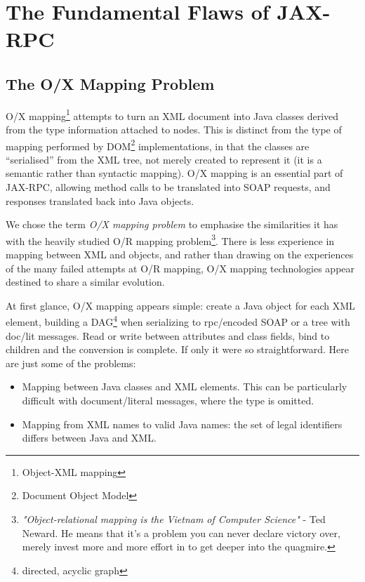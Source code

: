 \section{The Fundamental Flaws of JAX-RPC}
\label{objections}

\subsection{The O/X Mapping Problem}
\label{objections:o-x}

O/X mapping\footnote{Object-XML mapping} attempts to turn an XML
document into Java classes derived from the type information attached
to nodes. This is distinct from the type of mapping performed by
DOM\footnote{Document Object Model} implementations, in that the
classes are ``serialised'' from the XML tree, not merely created to
represent it (it is a semantic rather than syntactic mapping).  O/X
mapping is an essential part of JAX-RPC, allowing method calls to be
translated into SOAP requests, and responses translated back into Java
objects.

We chose the term \emph{O/X mapping problem} to emphasise the
similarities it has with the heavily studied O/R mapping
problem\footnote{ \emph{"Object-relational mapping is the Vietnam of
Computer Science"} - Ted Neward. He means that it's a problem you can
never declare victory over, merely invest more and more effort in to
get deeper into the quagmire.
}.  There is less experience in mapping between XML and objects, and
rather than drawing on the experiences of the many failed attempts at
O/R mapping, O/X mapping technologies appear destined to share a
similar evolution.

At first glance, O/X mapping appears simple: create a Java object
for each XML element, building a DAG\footnote{directed, acyclic graph}
when serializing to rpc/encoded SOAP or a tree with doc/lit
messages. Read or write between attributes and class fields, bind to
children and the conversion is complete. If only it were so
straightforward. Here are just some of the problems:


\begin{itemize}

\item Mapping between Java classes and XML elements. This can be
particularly difficult with document/literal messages, where the type
is omitted.

\item Mapping from XML names to valid Java names: the set of legal
identifiers differs between Java and XML.

\end{itemize}

